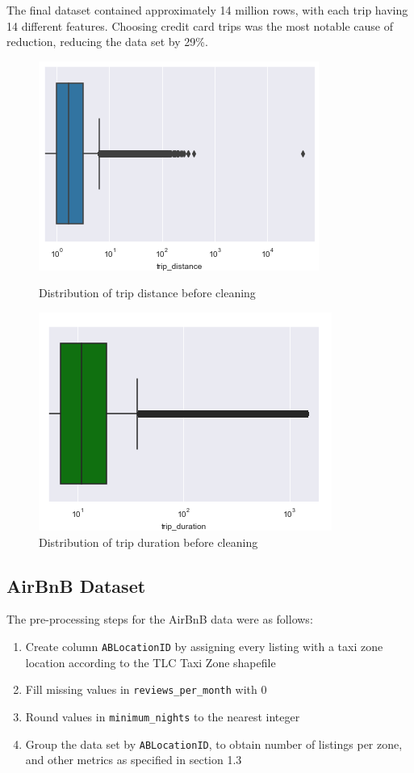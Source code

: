 \documentclass[11pt]{article}
\begin{document}
The final dataset contained approximately 14 million rows, with each trip having 14 different features. Choosing credit card trips was the most notable cause of reduction, reducing the data set by 29\%.
\begin{figure}[ht]
\centering
\begin{minipage}[b]{0.45\linewidth}
\includegraphics[scale=0.6]{plots/distance_pre_box.png}
\caption{Distribution of trip distance before cleaning}
\label{fig:minipage1}
\end{minipage}
\quad
\begin{minipage}[b]{0.45\linewidth}
\includegraphics[scale=0.6]{plots/duration_pre_box.PNG}
\caption{Distribution of trip duration before cleaning}
\label{fig:minipage2}
\end{minipage}
\end{figure}


 \subsection{AirBnB Dataset}
 The pre-processing steps for the AirBnB data were as follows:
 \begin{enumerate} 
    \item Create column \verb|ABLocationID| by assigning every listing with a taxi zone location according to the TLC Taxi Zone shapefile \cite{geo_data}
    \item Fill missing values in \verb|reviews_per_month| with 0
    \item Round values in \verb|minimum_nights| to the nearest integer
    \item Group the data set by \verb|ABLocationID|, to obtain number of listings per zone, and other metrics as specified in section 1.3
\end{enumerate}
\end{document}
